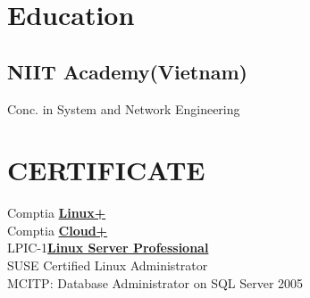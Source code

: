 \documentclass[letterpaper]{deedy-resume} %
\begin{document}
\begin{minipage}[t]{0.33\textwidth} %


\section{Education} 

\subsection{\textbf{NIIT Academy(Vietnam)}}


\sectionspace %

Conc. in System and Network Engineering \\

\sectionspace %



\section{CERTIFICATE} 

Comptia \href{https://www.certmetrics.com/comptia/public/transcript.aspx?transcript=E7F1NYH2D111S1YC}{\bf Linux+} \\
Comptia \href{https://www.certmetrics.com/comptia/public/verification.aspx?code=HGTR9P1G2H4E23KP}{\bf Cloud+} \\
LPIC-1\href{https://cs.lpi.org/caf/Xamman/certification}{\bf Linux Server Professional} \\
SUSE Certified Linux Administrator \\
MCITP: Database Administrator on SQL Server 2005 \\



\end{minipage}
\end{document}

